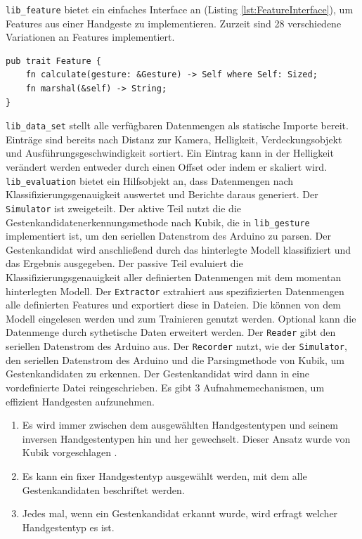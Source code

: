 \texttt{lib\_feature} bietet ein einfaches Interface an (Listing \ref{lst:FeatureInterface}), um Features aus einer Handgeste zu implementieren. Zurzeit sind 28 verschiedene Variationen an Features implementiert.
\begin{lstlisting}[label=lst:FeatureInterface,caption={Interface, um ein Feature zu implementieren.}]
pub trait Feature {
    fn calculate(gesture: &Gesture) -> Self where Self: Sized;
    fn marshal(&self) -> String;
}
\end{lstlisting}
\texttt{lib\_data\_set} stellt alle verfügbaren Datenmengen als statische Importe bereit. Einträge sind bereits nach Distanz zur Kamera, Helligkeit, Verdeckungsobjekt und Ausführungsgeschwindigkeit sortiert. Ein
Eintrag kann in der Helligkeit verändert werden entweder durch einen Offset oder indem er skaliert wird.
\newline
\newline
\texttt{lib\_evaluation} bietet ein Hilfsobjekt an, dass Datenmengen nach Klassifizierungsgenauigkeit auswertet und Berichte daraus generiert.
\newline
\newline
Der \texttt{Simulator} ist zweigeteilt. Der aktive Teil nutzt die die Gestenkandidatenerkennungsmethode nach Kubik, die in \texttt{lib\_gesture} implementiert ist, um den seriellen Datenstrom des Arduino zu parsen. Der
Gestenkandidat wird anschließend durch das hinterlegte Modell klassifiziert und das Ergebnis ausgegeben. Der passive Teil evaluiert die Klassifizierungsgenauigkeit aller definierten Datenmengen mit dem momentan
hinterlegten Modell.
\newline
\newline
Der \texttt{Extractor} extrahiert aus spezifizierten Datenmengen alle definierten Features und exportiert diese in Dateien. Die können von dem Modell eingelesen werden und zum Trainieren genutzt werden.
Optional kann die Datenmenge durch sythetische Daten erweitert werden.
\newline
\newline
Der \texttt{Reader} gibt den seriellen Datenstrom des Arduino aus.
\newline
\newline
Der \texttt{Recorder} nutzt, wie der \texttt{Simulator}, den seriellen Datenstrom des Arduino und die Parsingmethode von Kubik, um Gestenkandidaten zu erkennen.
Der Gestenkandidat wird dann in eine vordefinierte Datei reingeschrieben. Es gibt 3 Aufnahmemechanismen, um effizient Handgesten aufzunehmen.
\begin{enumerate}
    \item Es wird immer zwischen dem ausgewählten Handgestentypen und seinem inversen Handgestentypen hin und her gewechselt. Dieser Ansatz wurde von Kubik vorgeschlagen \cite{venzkeArticle}.
    \item Es kann ein fixer Handgestentyp ausgewählt werden, mit dem alle Gestenkandidaten beschriftet werden.
    \item Jedes mal, wenn ein Gestenkandidat erkannt wurde, wird erfragt welcher Handgestentyp es ist.
\end{enumerate}